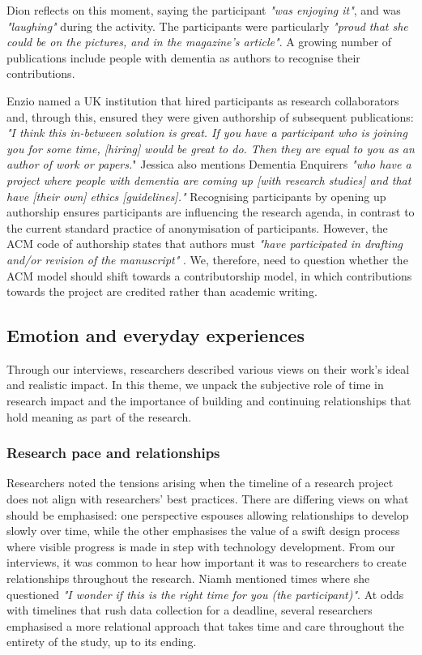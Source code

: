 Dion reflects on this moment, saying the participant \textit{"was enjoying it"}, and was \textit{"laughing"} during the activity. The participants were particularly \textit{"proud that she could be on the pictures, and in the magazine's article"}. A growing number of publications include people with dementia as authors to recognise their contributions. 

Enzio named a UK institution that hired participants as research collaborators and, through this, ensured they were given authorship of subsequent publications: \textit{"I think this in-between solution is great. If you have a participant who is joining you for some time, [hiring] would be great to do. Then they are equal to you as an author of work or papers.}" Jessica also mentions Dementia Enquirers \textit{"who have a project where people with dementia are coming up [with research studies] and that have [their own] ethics [guidelines]."} Recognising participants by opening up authorship ensures participants are influencing the research agenda, in contrast to the current standard practice of anonymisation of participants. However, the ACM code of authorship states that authors must \textit{"have participated in drafting and/or revision of the manuscript"} \citep{noauthor_criteria_nodate}. We, therefore, need to question whether the ACM model should shift towards a contributorship model, in which contributions towards the project are credited rather than academic writing.

\subsection{Emotion and everyday experiences}
\label{Ethics:ThemePartTwo}
Through our interviews, researchers described various views on their work’s ideal and realistic impact. In this theme, we unpack the subjective role of time in research impact and the importance of building and continuing relationships that hold meaning as part of the research.

\subsubsection{Research pace and relationships}
\label{Ethics:ThemePartTwo:Time}
Researchers noted the tensions arising when the timeline of a research project does not align with researchers' best practices. There are differing views on what should be emphasised: one perspective espouses allowing relationships to develop slowly over time, while the other emphasises the value of a swift design process where visible progress is made in step with technology development. From our interviews, it was common to hear how important it was to researchers to create relationships throughout the research. Niamh mentioned times where she questioned \textit{"I wonder if this is the right time for you (the participant)"}. At odds with timelines that rush data collection for a deadline, several researchers emphasised a more relational approach that takes time and care throughout the entirety of the study, up to its ending. 


